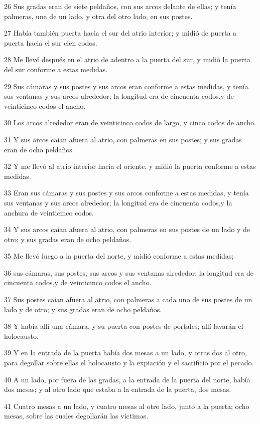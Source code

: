 \par 26 Sus gradas eran de siete peldaños, con sus arcos delante de ellas; y tenía palmeras, una de un lado, y otra del otro lado, en sus postes.
\par 27 Había también puerta hacia el sur del atrio interior; y midió de puerta a puerta hacia el sur cien codos.
\par 28 Me llevó después en el atrio de adentro a la puerta del sur, y midió la puerta del sur conforme a estas medidas.
\par 29 Sus cámaras y sus postes y sus arcos eran conforme a estas medidas, y tenía sus ventanas y sus arcos alrededor; la longitud era de cincuenta codos,y de veinticinco codos el ancho.
\par 30 Los arcos alrededor eran de veinticinco codos de largo, y cinco codos de ancho.
\par 31 Y sus arcos caían afuera al atrio, con palmeras en sus postes; y sus gradas eran de ocho peldaños.
\par 32 Y me llevó al atrio interior hacia el oriente, y midió la puerta conforme a estas medidas.
\par 33 Eran sus cámaras y sus postes y sus arcos conforme a estas medidas, y tenía sus ventanas y sus arcos alrededor; la longitud era de cincuenta codos,y la anchura de veinticinco codos.
\par 34 Y sus arcos caían afuera al atrio, con palmeras en sus postes de un lado y de otro; y sus gradas eran de ocho peldaños.
\par 35 Me llevó luego a la puerta del norte, y midió conforme a estas medidas;
\par 36 sus cámaras, sus postes, sus arcos y sus ventanas alrededor; la longitud era de cincuenta codos,y de veinticinco codos el ancho.
\par 37 Sus postes caían afuera al atrio, con palmeras a cada uno de sus postes de un lado y de otro; y sus gradas eran de ocho peldaños.
\par 38 Y había allí una cámara, y su puerta con postes de portales; allí lavarán el holocausto.
\par 39 Y en la entrada de la puerta había dos mesas a un lado, y otras dos al otro, para degollar sobre ellas el holocausto y la expiación y el sacrificio por el pecado.
\par 40 A un lado, por fuera de las gradas, a la entrada de la puerta del norte, había dos mesas; y al otro lado que estaba a la entrada de la puerta, dos mesas.
\par 41 Cuatro mesas a un lado, y cuatro mesas al otro lado, junto a la puerta; ocho mesas, sobre las cuales degollarán las víctimas.
